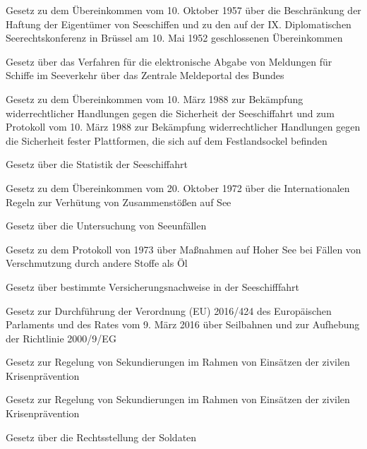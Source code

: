 \item[{SeeSchHaftÜbkG}] Gesetz zu dem Übereinkommen vom 10. Oktober 1957 über die Beschränkung der Haftung der Eigentümer von Seeschiffen und zu den auf der IX. Diplomatischen Seerechtskonferenz in Brüssel am 10. Mai 1952 geschlossenen Übereinkommen

\item[{SeeSchMeldPortalG}] Gesetz über das Verfahren für die elektronische Abgabe von Meldungen für Schiffe im Seeverkehr über das Zentrale Meldeportal des Bundes

\item[{SeeSchSiÜbkG}] Gesetz zu dem Übereinkommen vom 10. März 1988 zur Bekämpfung widerrechtlicher Handlungen gegen die Sicherheit der Seeschiffahrt und zum Protokoll vom 10. März 1988 zur Bekämpfung widerrechtlicher Handlungen gegen die Sicherheit fester Plattformen, die sich auf dem Festlandsockel befinden

\item[{SeeSchStatG}] Gesetz über die Statistik der Seeschiffahrt

\item[{SeeStrO1972ÜbkG}] Gesetz zu dem Übereinkommen vom 20. Oktober 1972 über die Internationalen Regeln zur Verhütung von Zusammenstößen auf See

\item[{SeeUG}] Gesetz über die Untersuchung von Seeunfällen

\item[{SeeVerschmProtG}] Gesetz zu dem Protokoll von 1973 über Maßnahmen auf Hoher See bei Fällen von Verschmutzung durch andere Stoffe als Öl

\item[{SeeVersNachwG}] Gesetz über bestimmte Versicherungsnachweise in der Seeschifffahrt

\item[{SeilbDG}] Gesetz zur Durchführung der Verordnung (EU) 2016/424 des Europäischen Parlaments und des Rates vom 9. März 2016 über Seilbahnen und zur Aufhebung der Richtlinie 2000/9/EG

\item[{SekG}] Gesetz zur Regelung von Sekundierungen im Rahmen von Einsätzen der zivilen Krisenprävention

\item[{SekG-2017}] Gesetz zur Regelung von Sekundierungen im Rahmen von Einsätzen der zivilen Krisenprävention

\item[{SG}] Gesetz über die Rechtsstellung der Soldaten

